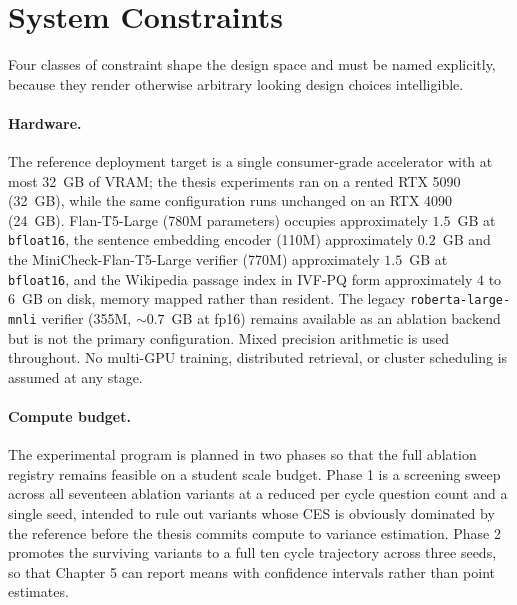 \section{System Constraints}
\label{sec:constraints}

Four classes of constraint shape the design space and must be named explicitly, because they render otherwise arbitrary looking design choices intelligible.

\paragraph{Hardware.} The reference deployment target is a single consumer-grade accelerator with at most 32~GB of VRAM; the thesis experiments ran on a rented RTX 5090 (32~GB), while the same configuration runs unchanged on an RTX 4090 (24~GB). Flan-T5-Large (780M parameters) occupies approximately $1.5$~GB at \texttt{bfloat16}, the sentence embedding encoder (110M) approximately $0.2$~GB and the MiniCheck-Flan-T5-Large verifier (770M) approximately $1.5$~GB at \texttt{bfloat16}, and the Wikipedia passage index in IVF-PQ form approximately $4$ to $6$~GB on disk, memory mapped rather than resident. The legacy \texttt{roberta-large-mnli} verifier (355M, ${\sim}0.7$~GB at fp16) remains available as an ablation backend but is not the primary configuration. Mixed precision arithmetic is used throughout. No multi-GPU training, distributed retrieval, or cluster scheduling is assumed at any stage.

\paragraph{Compute budget.} The experimental program is planned in two phases so that the full ablation registry remains feasible on a student scale budget. Phase 1 is a screening sweep across all seventeen ablation variants at a reduced per cycle question count and a single seed, intended to rule out variants whose CES is obviously dominated by the reference before the thesis commits compute to variance estimation. Phase 2 promotes the surviving variants to a full ten cycle trajectory across three seeds, so that Chapter 5 can report means with confidence intervals rather than point estimates.

